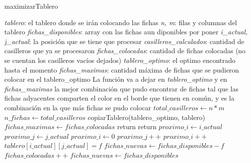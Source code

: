 \begin{algorithm}
	\caption{maximizarTablero} \label{ej_3:pseudo}
\end{algorithm} %
\begin{algorithmic}[1]
	\Require \emph{tablero}: el tablero donde se ir\'an colocando las fichas
	\Require \emph{n, m}: filas y columnas del tablero
	\Require \emph{fichas\_disponibles}: array con las fichas aun diponibles por poner
	\Require \emph{i\_actual, j\_actual}: la posici\'on que se tiene que procesar
	\Require \emph{casilleros\_calculados}: cantidad de casilleros que ya se procesaron
	\Require \emph{fichas\_colocadas}: cantidad de fichas colocadas (no se cuentan los casilleros vac\'ios dejados)
	\Require \emph{tablero\_optimo}: el optimo encontrado hasta el momento
	\Require \emph{fichas\_maximas}: cantidad m\'axima de fichas que se pudieron colocar en el tablero\_optimo
	\Ensure La funci\'on va a dejar en \emph{tablero\_optimo} y en \emph{fichas\_maximas} la mejor combinaci\'on que pudo encontrar de fichas tal que las fichas adyacentes comparten el color en el borde que tienen en com\'un, y es la combinaci\'on en la que m\'as fichas se pudo colocar
	\Statex
	\State $total\_casilleros \gets n*m$
	\State $n\_fichas \gets total\_casilleros$
	 \label{ej_3:pseudo:base}
			\State copiarTablero(tablero\_optimo, tablero)
			\State $fichas\_maximas \gets fichas\_colocadas$
		\EndIf
		\State return
	\EndIf \label{ej_3:pseudo:base_end}
	 \label{ej_3:pseudo:poda}
		\State return
	\EndIf
	\State $proximo\_i \gets i\_actual$ \label{ej_3:pseudo:proximo}
	\State $proximo\_j \gets j\_actual$
		\State $proximo\_i \gets 0$
		\State $proximo\_j++$
	\Else
		\State $proximo\_i++$
	\EndIf \label{ej_3:pseudo:proximo_end}
	 \label{ej_3:pseudo:fichas} \label{ej_3:pseudo:disponible}
		 \label{ej_3:pseudo:valida}
			\State $tablero[i\_actual][j\_actual] = f$ \label{ej_3:pseudo:coloca}
			 \label{ej_3:pseudo:vacia}
				\State $fichas\_nuevas \gets fichas\_disponibles - f$
				\State $fichas\_colocadas++$
			\Else
				\State $fichas\_nuevas \gets fichas\_disponibles$
			\EndIf

\end{algorithmic}

